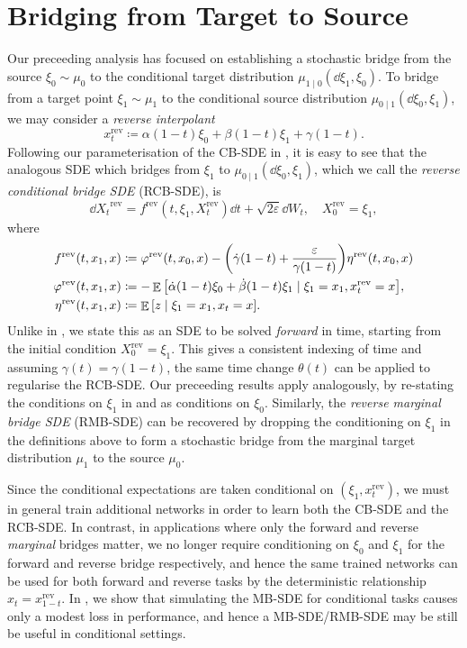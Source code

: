\section{Bridging from Target to Source} \label{sec:backwards}
Our preceeding analysis has focused on establishing a stochastic bridge from the source \(\xi_{0} \sim \mu_{0}\) to the conditional target distribution \(\mu_{1 \mid 0}(\dd{\xi_{1}}, \xi_{0})\). To bridge from a target point \(\xi_{1} \sim \mu_{1}\) to the conditional source distribution \(\mu_{0 \mid 1}(\dd{\xi_{0}}, \xi_{1})\), we may consider a \textit{reverse interpolant}
\[
  x_{t}^{\text{rev}} \coloneqq \alpha(1-t) \xi_{0} + \beta(1-t) \xi_{1} + \gamma(1-t).
\]
Following our parameterisation of the CB-SDE in , it is easy to see that the analogous SDE which bridges from \(\xi_{1}\) to \(\mu_{0 \mid 1}(\dd{\xi_{0}}, \xi_{1})\), which we call the \textit{reverse conditional bridge SDE} (RCB-SDE), is
\[
  \dd{X_{t}}^{\text{rev}} = f^{\text{rev}}(t, \xi_{1}, X_{t}^{\text{rev}}) \dd{t} + \sqrt{2\varepsilon}\dd{W_{t}}, \quad X_{0}^{\text{rev}} = \xi_{1},
\]
where
\begin{align*}
  f^{\text{rev}}(t, x_{1}, x) &\coloneqq \varphi^{\text{rev}}(t, x_{0}, x) - \qty( \dot{\gamma}(1-t) + \frac{\varepsilon}{\gamma(1-t)} ) \eta^{\text{rev}}(t, x_{0}, x) \\
  \varphi^{\text{rev}}(t, x_{1}, x) &\coloneqq -\mathop{\mathbb{E}}\qty[\dot{\alpha}(1-t) \xi_{0} + \dot{\beta}(1-t) \xi_{1} \mid \xi_{1} = x_{1}, x^{\text{rev}}_{t} = x], \\
  \eta^{\text{rev}}(t, x_{1}, x) &\coloneqq \mathop{\mathbb{E}}\qty[z \mid \xi_{1} = x_{1}, x_{t} = x].
\end{align*}
Unlike in \citet{albergo2023stochasticinterpolantsunifyingframework}, we state this as an SDE to be solved \textit{forward} in time, starting from the initial condition \(X_{0}^{\text{rev}} = \xi_{1}\). This gives a consistent indexing of time and assuming \(\gamma(t) = \gamma(1-t)\), the same time change \(\theta(t)\) can be applied to regularise the RCB-SDE. Our preceeding results apply analogously, by re-stating the conditions on \(\xi_{1}\) in  and  as conditions on \(\xi_{0}\). Similarly, the \textit{reverse marginal bridge SDE} (RMB-SDE) can be recovered by dropping the conditioning on \(\xi_{1}\) in the definitions above to form a stochastic bridge from the marginal target distribution \(\mu_{1}\) to the source \(\mu_{0}\).

Since the conditional expectations are taken conditional on \((\xi_{1}, x^{\text{rev}}_{t})\), we must in general train additional networks in order to learn both the CB-SDE and the RCB-SDE. In contrast, in applications where only the forward and reverse \textit{marginal} bridges matter, we no longer require conditioning on \(\xi_{0}\) and \(\xi_{1}\)  for the forward and reverse bridge respectively, and hence the same trained networks can be used for both forward and reverse tasks by the deterministic relationship \(x_{t} = x_{1-t}^{\text{rev}}\). In , we show that simulating the MB-SDE for conditional tasks causes only a modest loss in performance, and hence a MB-SDE/RMB-SDE may be still be useful in conditional settings.

